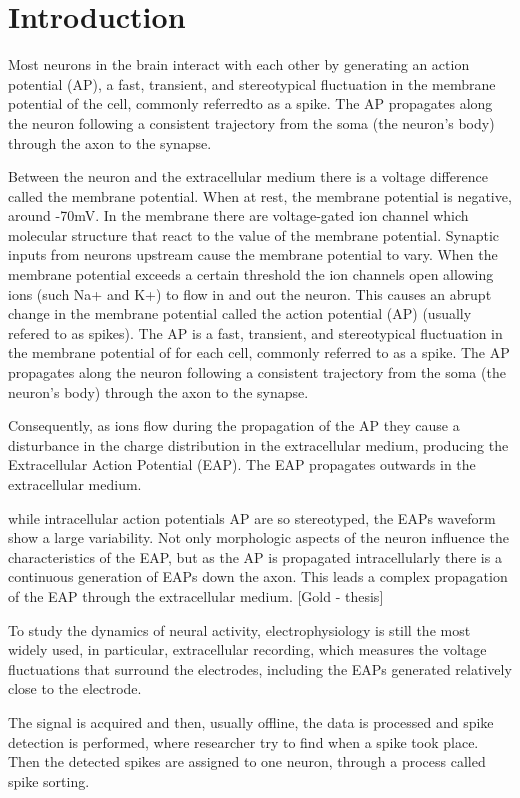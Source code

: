 \section{Introduction}
\label{sec:introduction}
Most neurons in the brain interact with each other by generating an action potential (AP), a fast,
transient, and stereotypical fluctuation in the membrane potential of the cell, commonly referredto as a spike. The AP propagates along the neuron following a consistent trajectory from the soma (the neuron's body) through the axon to the synapse. 

Between the neuron and the extracellular medium there is a voltage difference called the membrane potential. When at rest, the membrane potential is negative, around -70mV.  In the membrane there are voltage-gated ion channel which molecular structure that react to the value of the membrane potential. Synaptic inputs from neurons upstream cause the membrane potential to vary. When the membrane potential exceeds a certain threshold the ion channels open allowing ions (such Na+ and K+) to flow in and out the neuron. This causes an abrupt change in the membrane potential called the action potential (AP) (usually refered to as spikes). The AP is a fast, transient, and stereotypical fluctuation in the membrane potential of for each cell, commonly referred to as a spike. The AP propagates along the neuron following a consistent trajectory from the soma (the neuron's body) through the axon to the synapse. 

Consequently, as ions flow during the propagation of the AP they cause a disturbance in the charge distribution in the extracellular medium, producing the Extracellular Action Potential (EAP). The EAP propagates outwards in the extracellular medium. \cite{kandel}

while intracellular action potentials AP are so stereotyped, the EAPs waveform show a large variability. Not only morphologic aspects of the neuron influence the characteristics of the EAP, but as the AP is propagated intracellularly there is a continuous generation of EAPs  down the axon. This leads a complex propagation of the EAP through the extracellular medium. [Gold -  thesis]
 
To study the dynamics of neural activity, electrophysiology is still the most widely used, in particular, extracellular recording, which measures the voltage fluctuations that surround the electrodes, including the EAPs generated relatively close to the electrode.
 
The signal is acquired and then, usually offline, the data is processed and spike detection is performed, where researcher try to find when a spike took place. Then the detected spikes are assigned to one neuron, through a process called spike sorting.

